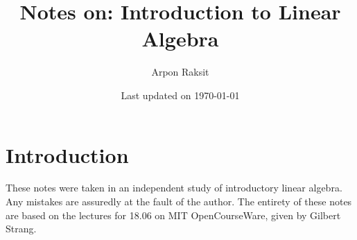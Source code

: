 \title{Notes on: Introduction to Linear Algebra}
\author{Arpon Raksit}
\date{Last updated on \today}
\maketitle
\thispagestyle{empty}

\newpage 
\setcounter{page}{1}
\section*{Introduction}

These notes were taken in an independent study of introductory linear algebra. Any mistakes are assuredly at the fault of the author. The entirety of these notes are based on the lectures for 18.06 on MIT OpenCourseWare, given by Gilbert Strang.

\vspace{25 pt}
\tableofcontents

\newpage

